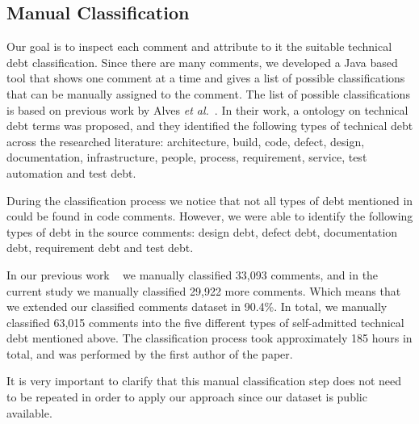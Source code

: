 
\subsection{Manual Classification} %
\label{sub:manual_classification}

Our goal is to inspect each comment and attribute to it the suitable technical debt classification. Since there are many comments, we developed a Java based tool that shows one comment at a time and gives a list of possible classifications that can be manually assigned to the comment. The list of possible classifications is based on previous work by Alves \textit{et al.}~\cite{Alves2014MTD}. In their work, a ontology on technical debt terms was proposed, and they identified the following types of technical debt across the researched literature: architecture, build, code, defect, design, documentation, infrastructure, people, process, requirement, service, test automation and test debt. 

During the classification process we notice that not all types of debt mentioned in \cite{Alves2014MTD} could be found in code comments. However, we were able to identify the following types of debt in the source comments: design debt, defect debt, documentation debt, requirement debt and test debt.

In our previous work ~\cite{Maldonado2015MTD} we manually classified 33,093 comments, and in the current study we manually classified 29,922 more comments. Which means that we extended our classified comments dataset in 90.4\%. In total, we manually classified 63,015 comments into the five different types of self-admitted technical debt mentioned above. The classification process took approximately 185 hours in total, and was performed by the first author of the paper. 


It is very important to clarify that this manual classification step does not need to be repeated in order to apply our approach since our dataset is public available.   

